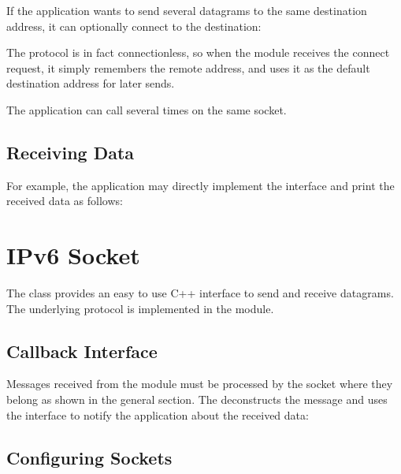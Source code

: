 
If the application wants to send several  datagrams to the same
destination address, it can optionally connect to the destination:


The  protocol is in fact connectionless, so when the
 module receives the connect request, it simply remembers the
remote address, and uses it as the default destination address for later sends.

The application can call  several times on the same socket.

\subsection*{Receiving Data}

For example, the application may directly implement the
 interface and print the received data as
follows:


\section{IPv6 Socket}
\label{sec:sockets:ipv6-socket}

The  class provides an easy to use C++ interface to send
and receive  datagrams. The underlying  protocol
is implemented in the  module.

\subsection*{Callback Interface}

Messages received from the  module must be processed by the socket
where they belong as shown in the general section. The 
deconstructs the message and uses the  interface
to notify the application about the received data:


\subsection*{Configuring Sockets}

